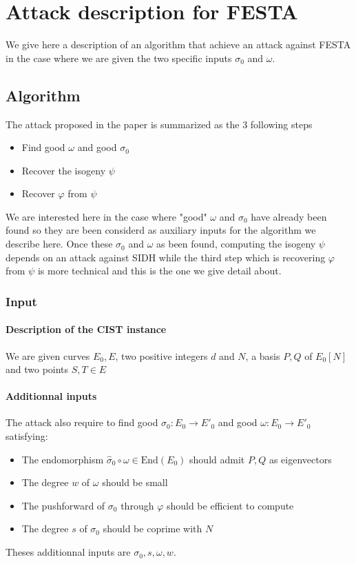 \documentclass[12pt,a4paper]{article}
\begin{document}
\section{Attack description for FESTA}

We give here a description of an algorithm that achieve an attack against FESTA in the case
where we are given the two specific inputs $\sigma_0$ and $\omega$. 


		\subsection{Algorithm}


		The attack proposed in the paper is summarized as the 3 following steps
		\begin{itemize}
			\item Find good $\omega$ and good $\sigma_0$ 
			\item Recover the isogeny $\psi$
			\item Recover $\varphi$ from $\psi$
		\end{itemize}
		We are interested here in the case where "good" $\omega$ and $\sigma_0$ have already been found
		so they are been considerd as auxiliary inputs for the algorithm we describe here. Once these
		$\sigma_0$ and $\omega$ as been found, computing the isogeny $\psi$ depends on an attack against
		SIDH while the third step which is recovering $\varphi$ from $\psi$ is more technical and this
		is the one we give detail about.

		\subsubsection{Input}
		\paragraph{Description of the CIST instance}
		We are given curves $E_0,E$, two positive integers $d$ and $N$, a basis $P,Q$ of $E_0[N]$ and
		two points  $S,T\in E$

		\paragraph{Additionnal inputs}
		The attack also require to find good $\sigma_0:E_0\to E'_0$ and good $\omega:E_0\to E'_0$ satisfying:
		\begin{itemize}
			\item The endomorphism $\widehat\sigma_0\circ\omega\in\mathrm{End}(E_0)$
				should admit $P,Q$ as eigenvectors
			\item The degree $w$ of $\omega$ should be small
			\item The pushforward of $\sigma_0$ through $\varphi$ should be efficient to compute
			\item The degree $s$ of $\sigma_0$ should be coprime with $N$
		\end{itemize}
		Theses additionnal inputs are $\sigma_0,s,\omega,w$.
\end{document}
